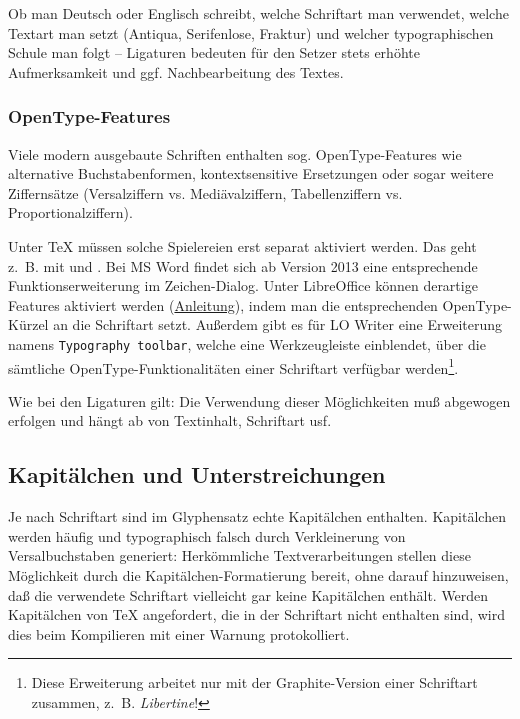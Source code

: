 \documentclass[11pt,a4paper,ngerman,DIV=8]{scrartcl}
\begin{document}
Ob man Deutsch oder Englisch schreibt, welche Schriftart man verwendet, welche Textart man setzt (Antiqua, Serifenlose, Fraktur) und welcher typographischen Schule man folgt -- Ligaturen bedeuten für den Setzer stets erhöhte Aufmerksamkeit und ggf. Nachbearbeitung des Textes.

\subsubsection{OpenType-Features}

Viele modern ausgebaute Schriften enthalten sog. OpenType-Features wie alternative Buchstabenformen, kontextsensitive Ersetzungen oder sogar weitere Ziffernsätze (Versalziffern vs. Mediävalziffern, Tabellenziffern vs. Proportionalziffern).

Unter \TeX{} müssen solche Spielereien erst separat aktiviert werden. Das geht z.~B. mit \XeTeX{} und \LuaTeX{}. Bei MS Word findet sich ab Version 2013 eine entsprechende Funktionserweiterung im Zeichen-Dialog. Unter LibreOffice können derartige Features aktiviert werden (\href{http://buchlayout.info/die-sensation-ist-perfekt-der-libreoffice-writer-unterstuetzt-ab-sofort-opentype-features/}{Anleitung}), indem man die entsprechenden OpenType-Kürzel an die Schriftart setzt. Außerdem gibt es für LO Writer eine Erweiterung namens \texttt{Typography toolbar}, welche eine Werkzeugleiste einblendet, über die sämtliche OpenType-Funktionalitäten einer Schriftart verfügbar werden\footnote{Diese Erweiterung arbeitet nur mit der Graphite-Version einer Schriftart zusammen, z.~B. \emph{Libertine}!}.

Wie bei den Ligaturen gilt: Die Verwendung dieser Möglichkeiten muß abgewogen erfolgen und hängt ab von Textinhalt, Schriftart usf.

\subsection{Kapitälchen und Unterstreichungen}

Je nach Schriftart sind im Glyphensatz echte Kapitälchen enthalten. Kapitälchen werden häufig und typographisch falsch durch Verkleinerung von Versalbuchstaben generiert: Herkömmliche Textverarbeitungen stellen diese Möglichkeit durch die Kapitälchen-Formatierung bereit, ohne darauf hinzuweisen, daß die verwendete Schriftart vielleicht gar keine Kapitälchen enthält. Werden Kapitälchen von \TeX{} angefordert, die in der Schriftart nicht enthalten sind, wird dies beim Kompilieren mit einer Warnung protokolliert.
\end{document}
